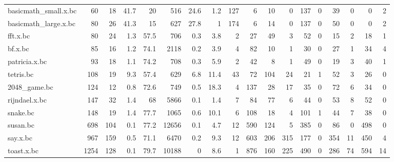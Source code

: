 \begin{tabular}{lrrrrrrrrrrrrrrrrr}
 basicmath\_small.x.bc &       60 &   18 &   41.7 &     20   &     516 &   24.6 &      1.2 &   127 &       6 &   10 &     0 &   137 &     0 &    39 &      0 &         0 &       2 \\
 basicmath\_large.x.bc &       80 &   26 &   41.3 &     15   &     627 &   27.8 &      1   &   174 &       6 &   14 &     0 &   137 &     0 &    50 &      0 &         0 &       2 \\
 fft.x.bc             &       80 &   24 &    1.3 &     57.5 &     706 &    0.3 &      3.8 &     2 &      27 &   49 &     3 &    52 &     0 &    15 &      2 &        18 &       1 \\
 bf.x.bc              &       85 &   16 &    1.2 &     74.1 &    2118 &    0.2 &      3.9 &     4 &      82 &   10 &     1 &    30 &     0 &    27 &      1 &        34 &       4 \\
 patricia.x.bc        &       93 &   18 &    1.1 &     74.2 &     708 &    0.3 &      5.9 &     2 &      42 &    8 &     1 &    49 &     0 &    19 &      3 &        40 &       1 \\
 tetris.bc            &      108 &   19 &    9.3 &     57.4 &     629 &    6.8 &     11.4 &    43 &      72 &  104 &    24 &    21 &     1 &    52 &      3 &        26 &       0 \\
 2048\_game.bc         &      124 &   12 &    0.8 &     72.6 &     749 &    0.5 &     18.3 &     4 &     137 &   28 &    17 &    35 &     0 &    72 &      6 &        34 &       0 \\
 rijndael.x.bc        &      147 &   32 &    1.4 &     68   &    5866 &    0.1 &      1.4 &     7 &      84 &   77 &     6 &    44 &     0 &    53 &      8 &        52 &       0 \\
 snake.bc             &      148 &   19 &    1.4 &     77.7 &    1065 &    0.6 &     10.1 &     6 &     108 &   18 &     4 &   101 &     1 &    44 &      7 &        38 &       0 \\
 susan.bc             &      698 &  104 &    0.1 &     77.2 &   12656 &    0.1 &      4.7 &    12 &     590 &  124 &     5 &   385 &     0 &    86 &      0 &       498 &       0 \\
 say.x.bc             &      967 &  159 &    0.5 &     71.1 &    6470 &    0.2 &      9.3 &    12 &     603 &  206 &   315 &   177 &     0 &   354 &     11 &       450 &       4 \\
 toast.x.bc           &     1254 &  128 &    0.1 &     79.7 &   10188 &    0   &      8.6 &     1 &     876 &  160 &   225 &   490 &     0 &   286 &     74 &       594 &      14 \\

\end{tabular}
